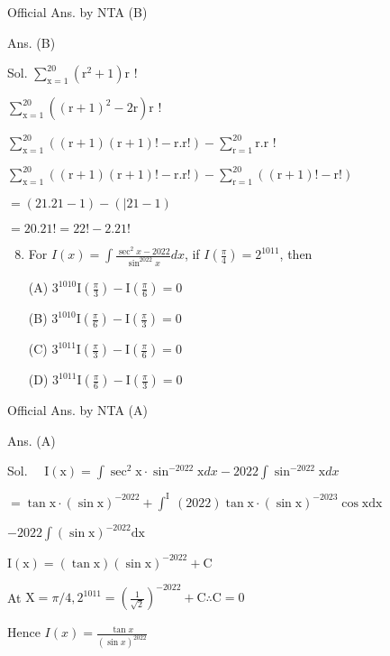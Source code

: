 \documentclass[10pt]{article}
\begin{document}
Official Ans. by NTA (B)

Ans. (B)

Sol. $\sum_{\mathrm{x}=1}^{20}\left(\mathrm{r}^{2}+1\right) \mathrm{r}$ !

$\sum_{\mathrm{x}=1}^{20}\left((\mathrm{r}+1)^{2}-2 \mathrm{r}\right) \mathrm{r}$ !

$\sum_{\mathrm{x}=1}^{20}((\mathrm{r}+1)(\mathrm{r}+1) !-\mathrm{r} . \mathrm{r} !)-\sum_{\mathrm{r}=1}^{20} \mathrm{r} . \mathrm{r}$ !

$\sum_{\mathrm{x}=1}^{20}((\mathrm{r}+1)(\mathrm{r}+1) !-\mathrm{r} . \mathrm{r} !)-\sum_{\mathrm{r}=1}^{20}((\mathrm{r}+1) !-\mathrm{r} !)$

$=(21.21-1)-(\mid 21-1)$

$=20.21 !=22 !-2.21 !$

\begin{enumerate}
  \setcounter{enumi}{7}
  \item For $I(x)=\int \frac{\sec ^{2} x-2022}{\sin ^{2022} x} d x$, if $I\left(\frac{\pi}{4}\right)=2^{1011}$, then

(A) $3^{1010} \mathrm{I}\left(\frac{\pi}{3}\right)-\mathrm{I}\left(\frac{\pi}{6}\right)=0$

(B) $3^{1010} \mathrm{I}\left(\frac{\pi}{6}\right)-\mathrm{I}\left(\frac{\pi}{3}\right)=0$

(C) $3^{1011} \mathrm{I}\left(\frac{\pi}{3}\right)-\mathrm{I}\left(\frac{\pi}{6}\right)=0$

(D) $3^{1011} \mathrm{I}\left(\frac{\pi}{6}\right)-\mathrm{I}\left(\frac{\pi}{3}\right)=0$
\end{enumerate}

Official Ans. by NTA (A)

Ans. (A)

Sol. $\quad \mathrm{I}(\mathrm{x})=\int \sec ^{2} \mathrm{x} \cdot \sin ^{-2022} \mathrm{x} d x-2022 \int \sin ^{-2022} \mathrm{x} d x$

$=\tan \mathrm{x} \cdot(\sin \mathrm{x})^{-2022}+\int^{\text {I }}(2022) \tan \mathrm{x} \cdot(\sin \mathrm{x})^{-2023} \cos \mathrm{xdx}$

$-2022 \int(\sin \mathrm{x})^{-2022} \mathrm{dx}$

$\mathrm{I}(\mathrm{x})=(\tan \mathrm{x})(\sin \mathrm{x})^{-2022}+\mathrm{C}$

At $\mathrm{X}=\pi / 4,2^{1011}=\left(\frac{1}{\sqrt{2}}\right)^{-2022}+\mathrm{C} \therefore \mathrm{C}=0$

Hence $I(x)=\frac{\tan x}{(\sin x)^{2022}}$
\end{document}
